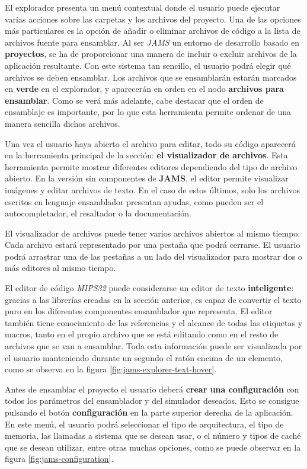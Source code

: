 El explorador presenta un menú contextual donde el usuario
puede ejecutar varias acciones sobre las carpetas y los archivos
del proyecto.
Una de las opciones más particulares es la opción de añadir o eliminar
archivos de código a la lista de archivos fuente para ensamblar.
Al ser \textit{JAMS} un entorno de desarrollo basado en \textbf{proyectos},
se ha de proporcionar una manera de incluir o excluir archivos de
la aplicación resultante.
Con este sistema tan sencillo, el usuario podrá elegir qué archivos se deben ensamblar.
Los archivos que se ensamblarán estarán marcados en \textbf{verde} en el explorador,
y aparecerán en orden en el nodo \textbf{archivos para ensamblar}.
Como se verá más adelante, cabe destacar que el orden de ensamblaje
es importante, por lo que esta herramienta permite ordenar de una manera
sencilla dichos archivos.

Una vez el usuario haya abierto el archivo para editar, todo su código
aparecerá en la herramienta principal de la sección: \textbf{el visualizador
de archivos}.
Esta herramienta permite mostrar diferentes editores dependiendo del tipo
de archivo abierto.
En la versión sin componentes de \textbf{JAMS}, el editor permite visualizar
imágenes y editar archivos de texto.
En el caso de estos últimos, solo los archivos escritos en
lenguaje ensamblador presentan ayudas, como pueden ser el autocompletador,
el resaltador o la documentación.

El visualizador de archivos puede tener varios archivos abiertos
al mismo tiempo.
Cada archivo estará representado por una pestaña que podrá cerrarse.
El usuario podrá arrastrar una de las pestañas a un lado del visualizador
para mostrar dos o más editores al mismo tiempo.

El editor de código \textit{MIPS32} puede considerarse un editor
de texto \textbf{inteligente}: gracias a las librerías creadas en la sección
anterior, es capaz de convertir el texto puro en los diferentes componentes
ensamblador que representa.
El editor también tiene conocimiento de las referencias y el alcance de
todas las etiquetas y macros, tanto en el propio archivo que se está editando
como en el resto de archivos que se van a ensamblar.
Toda esta información puede ser visualizada por el usuario manteniendo
durante un segundo el ratón encima de un elemento, como se observa
en la figura \ref{fig:jams-explorer-text-hover}.

Antes de ensamblar el proyecto el usuario deberá \textbf{crear una configuración}
con todos los parámetros del ensamblador y del simulador deseados.
Esto se consigue pulsando el botón \textbf{configuración} en la parte
superior derecha de la aplicación.
En este menú, el usuario podrá seleccionar el tipo de arquitectura,
el tipo de memoria, las llamadas a sistema que se desean usar,
o el número y tipos de caché que se desean utilizar, entre otras
muchas opciones, como se puede observar en la figura \ref{fig:jams-configuration}.


